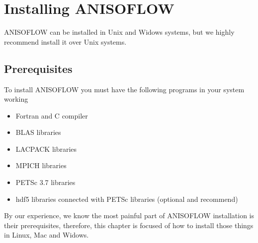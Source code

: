 \chapter{Installing ANISOFLOW}

ANISOFLOW can be installed in Unix and Widows systems, but we highly recommend install it over Unix systems.

\section{Prerequisites}
To install ANISOFLOW you must have the following programs in your system working
\begin{itemize}
\item Fortran and C compiler
\item BLAS libraries
\item LACPACK libraries
\item MPICH libraries
\item PETSc 3.7 libraries
\item hdf5 libraries connected with PETSc libraries (optional and recommend)
\end{itemize}

By our experience, we know the most painful part of ANISOFLOW installation is their prerequisites, therefore, this chapter is focused of how to install those things in  Linux, Mac and Widows. 